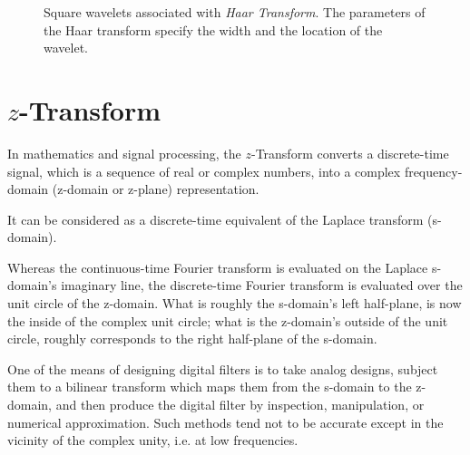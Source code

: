 \documentclass[\documentfontsize, twocolumn]{\classname}
\begin{document}
\begin{figure*}[ht]
\begin{center}
    \end{center}\caption{Square wavelets associated with \emph{Haar Transform}. The parameters of the Haar transform specify the width and the location of the wavelet.}\label{tikz:haarTransformWavelets}
\end{figure*}

\chapter{$z$-Transform}

In mathematics and signal processing, the $z$-Transform converts a discrete-time signal, which is a sequence of real or complex numbers, into a complex frequency-domain (z-domain or z-plane) representation.

It can be considered as a discrete-time equivalent of the Laplace transform (s-domain).

Whereas the continuous-time Fourier transform is evaluated on the Laplace s-domain's imaginary line, the discrete-time Fourier transform is evaluated over the unit circle of the z-domain. What is roughly the s-domain's left half-plane, is now the inside of the complex unit circle; what is the z-domain's outside of the unit circle, roughly corresponds to the right half-plane of the s-domain.

One of the means of designing digital filters is to take analog designs, subject them to a bilinear transform which maps them from the s-domain to the z-domain, and then produce the digital filter by inspection, manipulation, or numerical approximation. Such methods tend not to be accurate except in the vicinity of the complex unity, i.e. at low fre\-quen\-cies\cite{bib:zTransform}.
\end{document}
